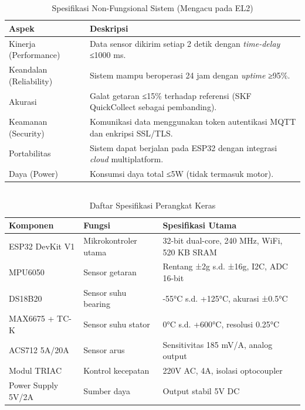\documentclass{elsinta}
\begin{document}
\subsection{\NonFunctionalSpecTitle}

\begin{table}[H]
\centering
\caption{Spesifikasi Non-Fungsional Sistem (Mengacu pada EL2)}
\renewcommand{\arraystretch}{1.2}
\begin{tabular}{p{} p{}}
    \hline
    \textbf{Aspek} & \textbf{Deskripsi} \\
    \hline
    Kinerja (Performance) & Data sensor dikirim setiap 2 detik dengan \textit{time-delay} ≤1000 ms. \\
    Keandalan (Reliability) & Sistem mampu beroperasi 24 jam dengan \textit{uptime} ≥95\%. \\
    Akurasi & Galat getaran ≤15\% terhadap referensi (SKF QuickCollect sebagai pembanding). \\
    Keamanan (Security) & Komunikasi data menggunakan token autentikasi MQTT dan enkripsi SSL/TLS. \\
    Portabilitas & Sistem dapat berjalan pada ESP32 dengan integrasi \textit{cloud} multiplatform. \\
    Daya (Power) & Konsumsi daya total ≤5W (tidak termasuk motor). \\
    \hline
\end{tabular}
\end{table}

\subsection{\HardwareSpecTitle}

\begin{table}[H]
\centering
\caption{Daftar Spesifikasi Perangkat Keras}
\renewcommand{\arraystretch}{1.2}
\begin{tabular}{p{} p{} p{}}
    \hline
    \textbf{Komponen} & \textbf{Fungsi} & \textbf{Spesifikasi Utama} \\
    \hline
    ESP32 DevKit V1 & Mikrokontroler utama & 32-bit dual-core, 240 MHz, WiFi, 520 KB SRAM \\
    MPU6050 & Sensor getaran & Rentang ±2g s.d. ±16g, I2C, ADC 16-bit \\
    DS18B20 & Sensor suhu bearing & -55°C s.d. +125°C, akurasi ±0.5°C \\
    MAX6675 + TC-K & Sensor suhu stator & 0°C s.d. +600°C, resolusi 0.25°C \\
    ACS712 5A/20A & Sensor arus & Sensitivitas 185 mV/A, analog output \\
    Modul TRIAC & Kontrol kecepatan & 220V AC, 4A, isolasi optocoupler \\
    Power Supply 5V/2A & Sumber daya & Output stabil 5V DC \\
    \hline
\end{tabular}
\end{table}
\end{document}
